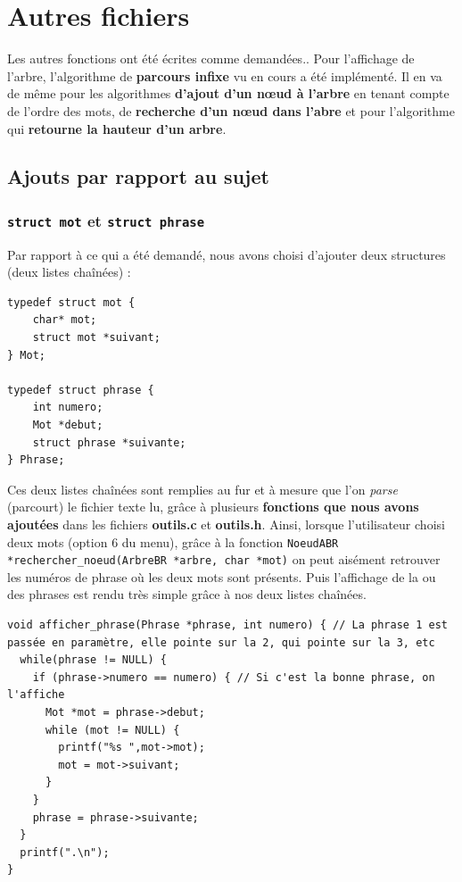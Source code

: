 \section{Autres fichiers}
Les autres fonctions ont été écrites comme demandées.. Pour l'affichage de l'arbre, l'algorithme de \textbf{parcours infixe} vu en cours a été implémenté. Il en va de même pour les algorithmes \textbf{d'ajout d'un n\oe ud à l'arbre} en tenant compte de l'ordre des mots, de \textbf{recherche d'un n\oe ud dans l'abre} et pour l'algorithme qui \textbf{retourne la hauteur d'un arbre}.

\subsection{Ajouts par rapport au sujet}
\subsubsection{\lstinline{struct mot} et \lstinline{struct phrase}}
Par rapport à ce qui a été demandé, nous avons choisi d'ajouter deux structures (deux listes chaînées) :
\begin{lstlisting}
typedef struct mot {
    char* mot;
    struct mot *suivant;
} Mot;

typedef struct phrase {
    int numero;
    Mot *debut;
    struct phrase *suivante;
} Phrase;
\end{lstlisting}
Ces deux listes chaînées sont remplies au fur et à mesure que l'on \textit{parse} (parcourt) le fichier texte lu, grâce à plusieurs \textbf{fonctions que nous avons ajoutées} dans les fichiers \textbf{outils.c} et \textbf{outils.h}. Ainsi, lorsque l'utilisateur choisi deux mots (option 6 du menu), grâce à la fonction \lstinline{NoeudABR *rechercher_noeud(ArbreBR *arbre, char *mot)} on peut aisément retrouver les numéros de phrase où les deux mots sont présents. Puis l'affichage de la ou des phrases est rendu très simple grâce à nos deux listes chaînées.
\begin{lstlisting}
void afficher_phrase(Phrase *phrase, int numero) { // La phrase 1 est passée en paramètre, elle pointe sur la 2, qui pointe sur la 3, etc
  while(phrase != NULL) {
    if (phrase->numero == numero) { // Si c'est la bonne phrase, on l'affiche
      Mot *mot = phrase->debut;
      while (mot != NULL) {
        printf("%s ",mot->mot);
        mot = mot->suivant;
      }
    }
    phrase = phrase->suivante;
  }
  printf(".\n");
}
\end{lstlisting}

